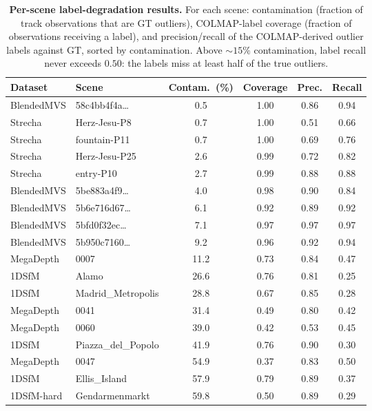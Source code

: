 \documentclass[10pt,twocolumn,letterpaper]{article}
\begin{document}
\begin{table}[t]\centering\footnotesize
\caption{\textbf{Per-scene label-degradation results.} For each scene: contamination (fraction of track observations that are GT outliers), COLMAP-label coverage (fraction of observations receiving a label), and precision/recall of the COLMAP-derived outlier labels against GT, sorted by contamination. Above ${\sim}15\%$ contamination, label recall never exceeds $0.50$: the labels miss at least half of the true outliers.}
\label{tab:supp_labelceiling}
\setlength{\tabcolsep}{3.5pt}%
\begin{tabular}{llcccc}
\toprule
Dataset & Scene & Contam.\ (\%) & Coverage & Prec. & Recall\\
\midrule
BlendedMVS & 58c4bb4f4a\ldots & 0.5 & 1.00 & 0.86 & 0.94\\
Strecha & Herz-Jesu-P8 & 0.7 & 1.00 & 0.51 & 0.66\\
Strecha & fountain-P11 & 0.7 & 1.00 & 0.69 & 0.76\\
Strecha & Herz-Jesu-P25 & 2.6 & 0.99 & 0.72 & 0.82\\
Strecha & entry-P10 & 2.7 & 0.99 & 0.88 & 0.88\\
BlendedMVS & 5be883a4f9\ldots & 4.0 & 0.98 & 0.90 & 0.84\\
BlendedMVS & 5b6e716d67\ldots & 6.1 & 0.92 & 0.89 & 0.92\\
BlendedMVS & 5bfd0f32ec\ldots & 7.1 & 0.97 & 0.97 & 0.97\\
BlendedMVS & 5b950c7160\ldots & 9.2 & 0.96 & 0.92 & 0.94\\
MegaDepth & 0007 & 11.2 & 0.73 & 0.84 & 0.47\\
1DSfM & Alamo & 26.6 & 0.76 & 0.81 & 0.25\\
1DSfM & Madrid\_Metropolis & 28.8 & 0.67 & 0.85 & 0.28\\
MegaDepth & 0041 & 31.4 & 0.49 & 0.80 & 0.42\\
MegaDepth & 0060 & 39.0 & 0.42 & 0.53 & 0.45\\
1DSfM & Piazza\_del\_Popolo & 41.9 & 0.76 & 0.90 & 0.30\\
MegaDepth & 0047 & 54.9 & 0.37 & 0.83 & 0.50\\
1DSfM & Ellis\_Island & 57.9 & 0.79 & 0.89 & 0.37\\
1DSfM-hard & Gendarmenmarkt & 59.8 & 0.50 & 0.89 & 0.29\\
\bottomrule
\end{tabular}
\end{table}
\end{document}

